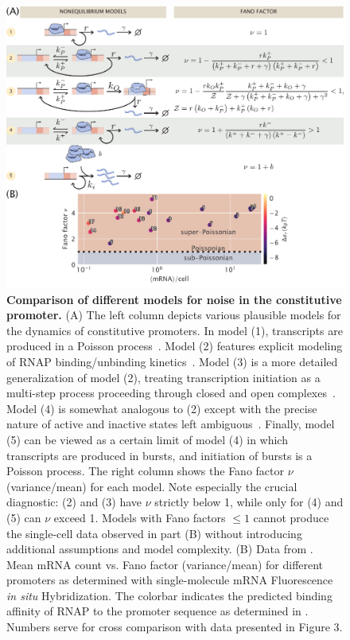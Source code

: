 \begin{figure}%
\centering
\includegraphics[width=\textwidth]{../figures/main/fig02.pdf}
\caption{\textbf{Comparison of different models for noise in the constitutive promoter.}
(A) The left column depicts various plausible models for the dynamics of
constitutive promoters. In model (1), transcripts are produced in a Poisson
process~\cite{Sanchez2013, Jones2014}. Model (2) features explicit modeling of
RNAP binding/unbinding kinetics~\cite{Phillips2015a}. Model (3) is a more
detailed generalization of model (2), treating transcription initiation as a
multi-step process proceeding through closed and open
complexes~\cite{Mitarai2015}. Model (4) is somewhat analogous to (2) except with
the precise nature of active and inactive states left
ambiguous~\cite{Peccoud1995, Shahrezaei2008, Razo-Mejia2020}. Finally, model (5)
can be viewed as a certain limit of model (4) in which transcripts are produced
in bursts, and initiation of bursts is a Poisson process. 
The right column shows the Fano factor $\nu$ (variance/mean) for each model.
Note especially the crucial diagnostic: (2) and (3) have $\nu$ strictly below 1,
while only for (4) and (5) can $\nu$ exceed 1. Models with Fano factors $\le 1$
cannot produce the single-cell data observed in part (B) without introducing
additional assumptions and model complexity. (B) Data from \cite{Jones2014}.
Mean mRNA count vs. Fano factor (variance/mean) for different promoters as
determined with single-molecule mRNA Fluorescence \textit{in situ}
Hybridization. The colorbar indicates the predicted binding affinity of RNAP to
the promoter sequence as determined in \cite{Brewster2012}. Numbers serve for
cross comparison with data presented in Figure 3.}
\label{fig2:constit_cartoons}
\end{figure}

